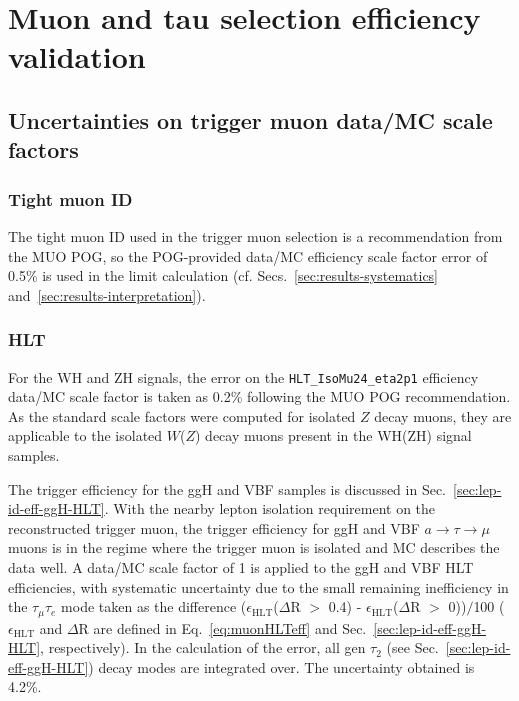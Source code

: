\chapter{Muon and tau selection efficiency validation\label{sec:lepideff}}

\section{Uncertainties on trigger muon data/MC scale factors\label{sec:lepideff-triggermu}}

\subsection{Tight muon ID\label{lepideff-tightID}}

The tight muon ID used in the trigger muon selection is a recommendation from the MUO POG, so the POG-provided data/MC efficiency scale factor error of 0.5\% is used in the limit calculation (cf. Secs.~\ref{sec:results-systematics} and~\ref{sec:results-interpretation}).

\subsection{HLT\label{lepideff-HLT}}

For the WH and ZH signals, the error on the \texttt{HLT\_IsoMu24\_eta2p1} efficiency data/MC scale factor is taken as 0.2\% following the MUO POG recommendation.  As the standard scale factors were computed for isolated $Z$ decay muons, they are applicable to the isolated $W$($Z$) decay muons present in the WH(ZH) signal samples.

The trigger efficiency for the ggH and VBF samples is discussed in Sec.~\ref{sec:lep-id-eff-ggH-HLT}.  With the nearby lepton isolation requirement on the reconstructed trigger muon, the trigger efficiency for ggH and VBF $a\rightarrow\tau\to\mu$ muons is in the regime where the trigger muon is isolated and MC describes the data well.  A data/MC scale factor of 1 is applied to the ggH and VBF HLT efficiencies, with systematic uncertainty due to the small remaining inefficiency in the $\tau_{\mu}\tau_{e}$ mode taken as the difference ($\epsilon_{\text{HLT}}$($\Delta$R $>$ 0.4) - $\epsilon_{\text{HLT}}$($\Delta$R $>$ 0))$/$100 ($\epsilon_{\text{HLT}}$ and $\Delta$R are defined in Eq.~\ref{eq:muonHLTeff} and Sec.~\ref{sec:lep-id-eff-ggH-HLT}, respectively).  In the calculation of the error, all gen $\tau_{\text{2}}$ (see Sec.~\ref{sec:lep-id-eff-ggH-HLT}) decay modes are integrated over.  The uncertainty obtained is 4.2\%.


